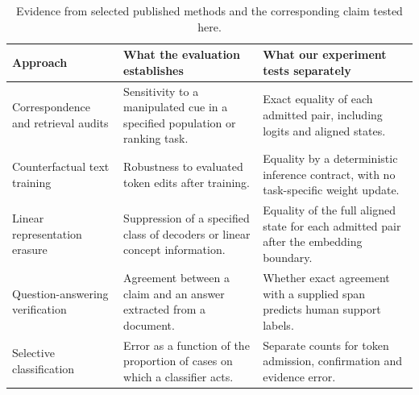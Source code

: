 \begin{table}[tbp]
\small
\centering
\caption[Comparison with published methods]{Evidence from selected published methods and the corresponding claim tested here.}
\label{tab:methods}
\begin{tabularx}{\linewidth}{@{}>{\raggedright\arraybackslash}p{.23\linewidth}
 >{\raggedright\arraybackslash}X >{\raggedright\arraybackslash}X@{}}
\toprule
Approach & What the evaluation establishes & What our experiment tests separately \\
\midrule
Correspondence and retrieval audits \citep{bertrand2004,wilson2024}
 & Sensitivity to a manipulated cue in a specified population or ranking task.
 & Exact equality of each admitted pair, including logits and aligned states.\\[2pt]
Counterfactual text training \citep{garg2019}
 & Robustness to evaluated token edits after training.
 & Equality by a deterministic inference contract, with no task-specific weight update.\\[2pt]
Linear representation erasure \citep{ravfogel2020,belrose2023}
 & Suppression of a specified class of decoders or linear concept information.
 & Equality of the full aligned state for each admitted pair after the embedding boundary.\\[2pt]
Question-answering verification \citep{wang2020,fabbri2022}
 & Agreement between a claim and an answer extracted from a document.
 & Whether exact agreement with a supplied span predicts human support labels.\\[2pt]
Selective classification \citep{geifman2017,jones2021}
 & Error as a function of the proportion of cases on which a classifier acts.
 & Separate counts for token admission, confirmation and evidence error.\\
\bottomrule
\end{tabularx}
\end{table}
